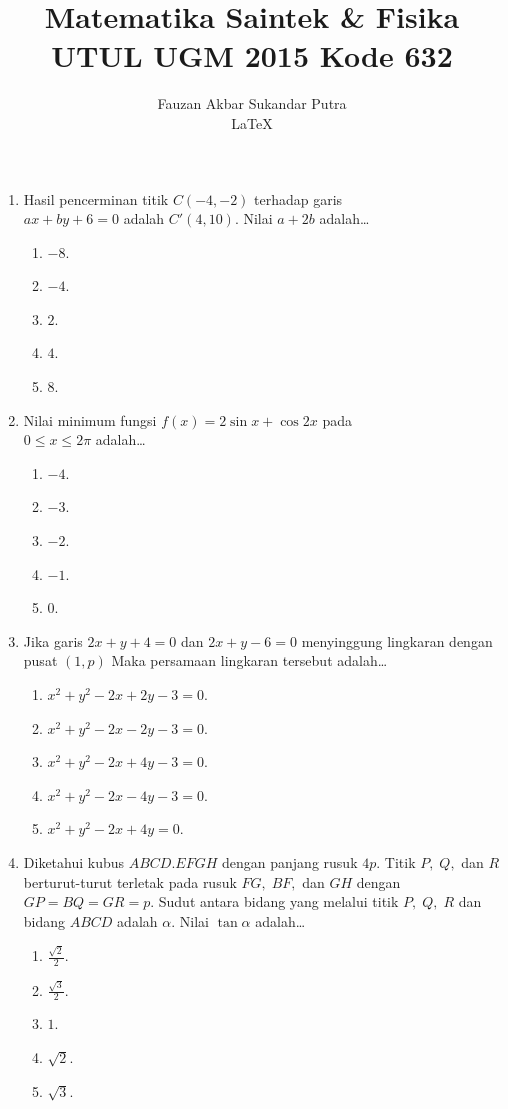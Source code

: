\documentclass[A4,12PT, english, twocolumn]{journal}
\title{Matematika Saintek \& Fisika UTUL UGM 2015 Kode 632}
\author{Fauzan Akbar Sukandar Putra \\ \LaTeX}
\begin{document}
\maketitle

\begin{enumerate}

\item Hasil pencerminan titik $C(-4,-2)$ terhadap garis \\ $ax+by+6=0$ adalah $C'(4,10)$. Nilai $a+2b$ adalah\dots
    \begin{enumerate}
        \item $-8$.
        \item $-4$.
        \item $2$.
        \item $4$.
        \item $8$.
    \end{enumerate}
  
\item Nilai minimum fungsi $f(x)=2\sin x+\cos 2x$ pada \\ $0\le x\le 2\pi$ adalah\dots
    \begin{enumerate}
        \item $-4$.
        \item $-3$.
        \item $-2$.
        \item $-1$.
        \item $0$.
    \end{enumerate}
     
\item Jika garis $2x+y+4=0$ dan $2x+y-6=0$ menyinggung lingkaran dengan pusat $(1,p)$ Maka persamaan lingkaran tersebut adalah\dots
    \begin{enumerate}
        \item $x^2+y^2-2x+2y-3=0$.
        \item $x^2+y^2-2x-2y-3=0$.
        \item $x^2+y^2-2x+4y-3=0$.
        \item $x^2+y^2-2x-4y-3=0$.
        \item $x^2+y^2-2x+4y=0$.
    \end{enumerate}

\item Diketahui kubus $ABCD.EFGH$ dengan panjang rusuk $4p$. Titik $P, \; Q,$ dan $R$ berturut-turut terletak pada rusuk $FG, \; BF,$ dan $GH$ dengan $GP = BQ = GR = p$. Sudut antara bidang yang melalui titik $P, \; Q, \; R$ dan bidang $ABCD$ adalah $\alpha$. Nilai $\tan{\alpha}$ adalah\dots
    \begin{enumerate}
        \item $\frac{\sqrt{2}}{2}$.
        \item $\frac{\sqrt{3}}{2}$.
        \item $1$.
        \item $\sqrt{2}$.
        \item $\sqrt{3}$.
    \end{enumerate}


\end{enumerate}
\end{document}
